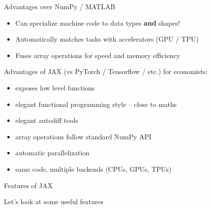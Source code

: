 \begin{frame}
    
    Advantages over NumPy / MATLAB

    \vspace{0.5em}
    \begin{itemize}
        \item Can specialize machine code to data types \textbf{and} shapes!
        \vspace{0.5em}
        \vspace{0.5em}
        \vspace{0.5em}
        \item Automatically matches tasks with accelerators (GPU / TPU)
        \vspace{0.5em}
        \vspace{0.5em}
        \vspace{0.5em}
        \item Fuses array operations for speed and memory efficiency
    \end{itemize}

\end{frame}

\begin{frame}

    Advantages of JAX (vs PyTorch / Tensorflow / etc.) for economists:
    \begin{itemize}
        \item exposes low level functions
            \vspace{0.5em}
        \item elegant functional programming style -- close to maths
            \vspace{0.5em}
        \item elegant autodiff tools
            \vspace{0.5em}
        \item array operations follow standard NumPy API
            \vspace{0.5em}
        \item automatic parallelization
            \vspace{0.5em}
        \item same code, multiple backends (CPUs, GPUs, TPUs)
    \end{itemize}

\end{frame}

\begin{frame}{Features of JAX}

    Let's look at some useful features
    
\end{frame}

